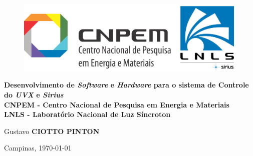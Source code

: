 \begin{titlepage}
\vspace*{.23\textheight}
\begin{center}
%
\begin{figure}[h]
    \centering
    \includegraphics[scale=0.14]{image/CNPEM_LNLS}
\end{figure} 

%
\vspace*{10pt}
\textbf{\LARGE Desenvolvimento de \textit{Software} e \textit{Hardware} para o
sistema de Controle do \textit{UVX} e \textit{Sirius}}
\\
\vspace{12pt} 
\textbf{CNPEM - Centro Nacional de Pesquisa em Energia e Materiais} \\ \vspace{12pt} 
\textbf{LNLS - Laboratório Nacional de Luz Síncroton} \\
\vspace*{72pt}

Gustavo \textbf{CIOTTO PINTON}
 
Campinas, \today

\end{center}
\end{titlepage} 

\newpage